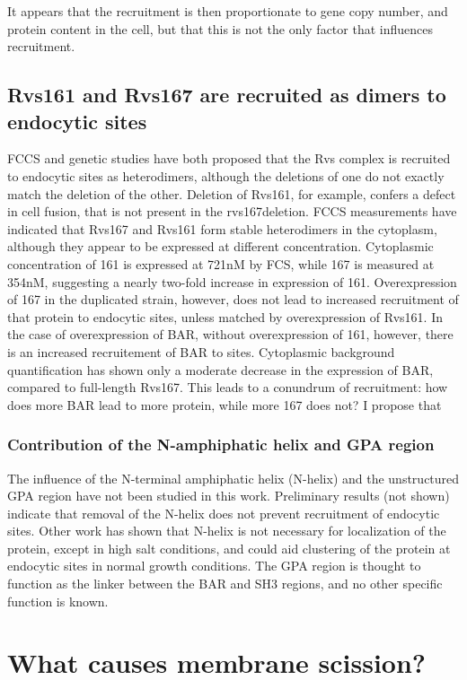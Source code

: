 It appears that the recruitment is then proportionate to gene copy number, and protein content in the cell, but that this is not the only factor that influences recruitment. 


\subsection{Rvs161 and Rvs167 are recruited as dimers to endocytic sites}
FCCS and genetic studies have both proposed that the Rvs complex is recruited to endocytic sites as heterodimers, although the deletions of one do not exactly match the deletion of the other. Deletion of Rvs161, for example, confers a defect in cell fusion, that is not present in the rvs167deletion. FCCS measurements have indicated that Rvs167 and Rvs161 form stable heterodimers in the cytoplasm, although they appear to be expressed at different concentration. Cytoplasmic concentration of 161 is expressed at 721nM by FCS, while 167 is measured at 354nM, suggesting a nearly two-fold increase in expression of 161. Overexpression of 167 in the duplicated strain, however, does not lead to increased recruitment of that protein to endocytic sites, unless matched by overexpression of Rvs161. In the case of overexpression of BAR, without overexpression of 161, however, there is an increased recruitement of BAR to sites. Cytoplasmic background quantification has shown only a moderate decrease in the expression of BAR, compared to full-length Rvs167. This leads to a conundrum of recruitment: how does more BAR lead to more protein, while more 167 does not? I propose that 

\subsubsection{Contribution of the N-amphiphatic helix and GPA region}
The influence of the N-terminal amphiphatic helix (N-helix) and the unstructured GPA region have not been studied in this work. Preliminary results (not shown) indicate that removal of the N-helix does not prevent recruitment of endocytic sites. Other work has shown that N-helix is not necessary for localization of the protein, except in high salt conditions, and could aid clustering of the protein at endocytic sites in normal growth conditions. The GPA region is thought to function as the linker between the BAR and SH3 regions, and no other specific function is known. 

\section{What causes membrane scission?}


